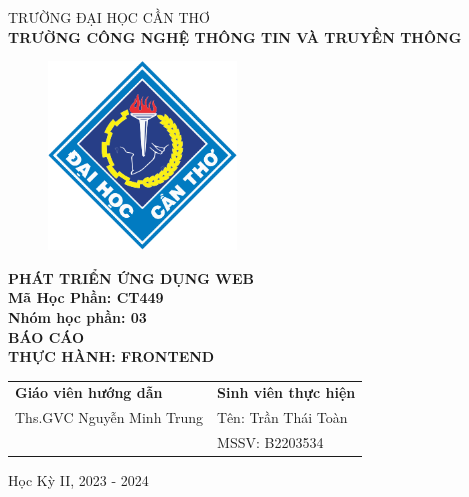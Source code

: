 \begin{titlepage}
  \begin{center}
    \vspace{-6pt}TRƯỜNG ĐẠI HỌC CẦN THƠ \\
    \textbf{\fontsize{16pt}{0pt}\selectfont TRƯỜNG CÔNG NGHỆ THÔNG TIN VÀ TRUYỀN THÔNG}
    \begin{figure}[H]
      \centering
      \includegraphics[width=5cm]{imgs/logo-ctu.png}
    \end{figure}
    \textbf{PHÁT TRIỂN ỨNG DỤNG WEB} \\
    \textbf{Mã Học Phần: CT449} \\
    \textbf{Nhóm học phần: 03} \\
    \vspace{3.5cm}
    \textbf{\fontsize{16pt}{0pt}\selectfont BÁO CÁO} \\
    \textbf{\fontsize{18pt}{0pt}\selectfont THỰC HÀNH: FRONTEND} \\
    \vspace{4.5cm}
    \newcommand{\MyIndent}{\hspace{1cm}}
    \begin{tabular}{p{8cm} l}
      \textbf{Giáo viên hướng dẫn}        & \textbf{Sinh viên thực hiện}  \\
      \MyIndent Ths.GVC Nguyễn Minh Trung & \MyIndent Tên: Trần Thái Toàn \\
                                          & \MyIndent MSSV: B2203534
    \end{tabular}


    \vspace{2cm}
    \fontsize{14pt}{0pt}\selectfont Học Kỳ II, 2023 - 2024
  \end{center}
\end{titlepage}
\cleardoublepage
